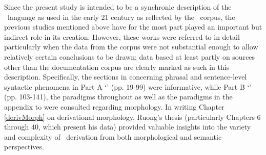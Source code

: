 Since the present study is intended to be a synchronic description of the \PS\ language as used in the early 21 century as reflected by the \PSDP\ corpus, the previous studies mentioned above have for the most part played an important but indirect role in its creation. However, these works were referred to in detail particularly when the data from the corpus were not substantial enough to allow relatively certain conclusions to be drawn; data based at least partly on sources other than the documentation corpus are clearly marked as such in this description. Specifically, the sections in \mbox{\citet{Lagercrantz1926}} concerning phrasal and sentence-level syntactic phenomena in Part A ‘’ (pp. 19-99) were informative, while Part B ‘’ (pp. 103-141), the paradigms throughout \citet{Halasz1896} as well as the paradigms in the appendix to \citet[150-166]{Lehtiranta1992} were consulted regarding morphology. In writing Chapter \ref{derivMorph} on derivational morphology, Ruong’s thesis  (particularly Chapters 6 through 40, which present his data) provided valuable insights into the variety and complexity of \PS\ derivation from both morphological and semantic perspectives. %

